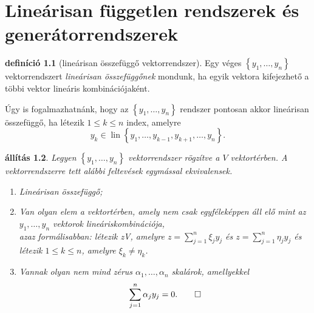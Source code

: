 \documentclass[9pt,showtrims]{memoir}
\theoremstyle{plain}
\newtheorem{proposition}{állítás}[chapter]
\theoremstyle{remark}
\theoremstyle{definition}
\newtheorem{definition}[proposition]{definíció}
\DeclareMathOperator{\lin}{lin}
\begin{document}
\chapter{Lineárisan független rendszerek és generátorrendszerek}
\begin{definition}[lineárisan összefüggő vektorrendszer]
    Egy véges $\left\{ y_1,\dots,y_n \right\}$ vektorrendszert \emph{lineárisan összefüggőnek}
    mondunk, ha egyik vektora kifejezhető a többi vektor lineáris kombinációjaként.
\end{definition}
Úgy is fogalmazhatnánk, hogy az $\left\{ y_1,\dots,y_n \right\}$ rendszer pontosan akkor
lineárisan összefüggő, ha létezik $1\leq k\leq n$ index, amelyre
\[
    y_k\in\lin\left\{ y_1,\dots,y_{k-1},y_{k+1},\dots,y_n \right\}.
\]
\begin{proposition}
    Legyen $\left\{ y_1,\dots,y_n \right\}$ vektorrendszer rögzítve a $V$ vektortérben.
    A vektorrendszerre tett alábbi feltevések egymással ekvivalensek.
    \begin{enumerate}
        \item Lineárisan összefüggő;
        \item Van olyan elem a vektortérben, amely nem csak egyféleképpen áll elő mint az $y_1,\dots,y_n$
            vektorok lineáriskombinációja,\\
            azaz formálisabban:
            létezik z\in V, amelyre $z=\sum_{j=1}^n\xi_jy_j$ és $z=\sum_{j=1}^n\eta_jy_j$
            és létezik $1\leq k\leq n$, amelyre $\xi_k\neq\eta_k$.
        \item Vannak olyan nem mind zérus $\alpha_1,\dots,\alpha_n$ skalárok, amellyekkel
            \[
                \sum_{j=1}^n\alpha_jy_j=0.\qedhere
            \]
    \end{enumerate}
\end{proposition}
\end{document}
